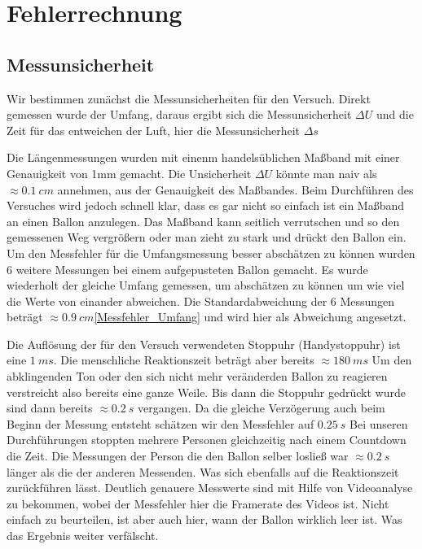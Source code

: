 \documentclass{article}
\begin{document}
    \section{Fehlerrechnung}
        \subsection{Messunsicherheit}
            Wir bestimmen zunächst die Messunsicherheiten für den Versuch.
            Direkt gemessen wurde der Umfang, daraus ergibt sich die Messunsicherheit \(\Delta U\)
            und die Zeit für das entweichen der Luft, hier die Messunsicherheit \(\Delta s\)

            Die Längenmessungen wurden mit einenm handelsüblichen Maßband mit einer Genauigkeit von 1mm gemacht.
            Die Unsicherheit \( \Delta U \) könnte man naiv als \( \approx \SI{0.1}{cm} \) annehmen, aus der Genauigkeit des Maßbandes.
            Beim Durchführen des Versuches wird jedoch schnell klar, dass es gar nicht so einfach ist ein Maßband an einen Ballon anzulegen.
            Das Maßband kann seitlich verrutschen und so den gemessenen Weg vergrößern oder man zieht zu stark und drückt den Ballon ein.
            Um den Messfehler für die Umfangsmessung besser abschätzen zu können wurden
            6 weitere Messungen bei einem aufgepusteten Ballon gemacht.
            Es wurde wiederholt der gleiche Umfang gemessen, um abschätzen zu können um wie viel die Werte von einander abweichen.
            Die Standardabweichung der 6 Messungen beträgt \( \approx \SI{0.9}{cm}\)\ref{Messfehler_Umfang} und wird hier als Abweichung angesetzt.
            
            Die Auflösung der für den Versuch verwendeten Stoppuhr (Handystoppuhr) ist eine \(\SI{1}{ms}\).
            Die menschliche Reaktionszeit beträgt aber bereits \(\approx \SI{180}{ms} \)\cite{Reaktionszeit}
            Um den abklingenden Ton oder den sich nicht mehr veränderden Ballon zu reagieren verstreicht also bereits eine ganze Weile.
            Bis dann die Stoppuhr gedrückt wurde sind dann bereits \(\approx \SI{0.2}{s}\) vergangen.
            Da die gleiche Verzögerung auch beim Beginn der Messung entsteht schätzen wir den Messfehler auf \(\SI{0.25}{s}\)
            Bei unseren Durchführungen stoppten mehrere Personen gleichzeitig nach einem Countdown die Zeit. Die Messungen der
            Person die den Ballon selber losließ war \(\approx \SI{0.2}{s} \) länger als die der anderen Messenden.
            Was sich ebenfalls auf die Reaktionszeit zurückführen lässt.
            Deutlich genauere Messwerte sind mit Hilfe von Videoanalyse zu bekommen, wobei der Messfehler hier die Framerate des Videos ist.
            Nicht einfach zu beurteilen, ist aber auch hier, wann der Ballon wirklich \glqq{}leer\grqq{} ist. Was das Ergebnis weiter verfälscht.
\end{document}
